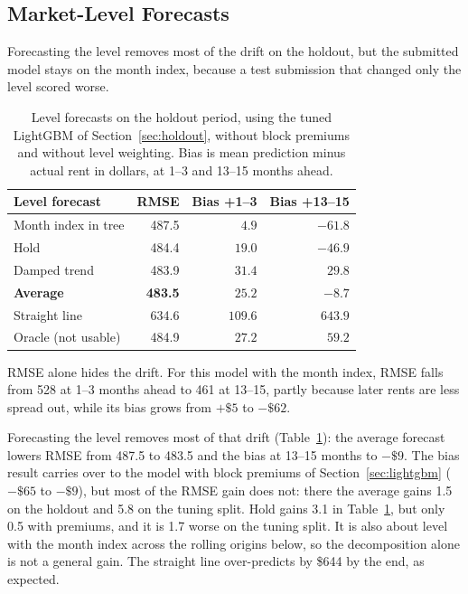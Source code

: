 
\subsection{Market-Level Forecasts}
\label{sec:level-results}

Forecasting the level removes most of the drift on the holdout, but the submitted model stays on the month index, because a test submission that changed only the level scored worse.

\begin{table}[htbp]
\caption{Level forecasts on the holdout period, using the tuned LightGBM of Section~\ref{sec:holdout}, without block premiums and without level weighting. Bias is mean prediction minus actual rent in dollars, at 1--3 and 13--15 months ahead.}
\begin{center}
\begin{tabular}{|l|r|r|r|}
\hline
\textbf{Level forecast} & \textbf{RMSE} & \textbf{Bias +1--3} &
\textbf{Bias +13--15} \\
\hline
Month index in tree     & 487.5 & $4.9$   & $-61.8$ \\
Hold                    & 484.4 & $19.0$  & $-46.9$ \\
Damped trend            & 483.9 & $31.4$  & $29.8$ \\
\textbf{Average}        & \textbf{483.5} & $25.2$ & $-8.7$ \\
Straight line           & 634.6 & $109.6$ & $643.9$ \\
\hline
Oracle (not usable)     & 484.9 & $27.2$  & $59.2$ \\
\hline
\end{tabular}
\label{tab:level-holdout}
\end{center}
\end{table}

RMSE alone hides the drift. For this model with the month index, RMSE falls
from 528 at 1--3 months ahead to 461 at 13--15, partly because later rents are
less spread out, while its bias grows from $+\$5$ to $-\$62$.

Forecasting the level removes most of that drift
(Table~\ref{tab:level-holdout}): the average forecast lowers RMSE from 487.5 to
483.5 and the bias at 13--15 months to $-\$9$. The bias result carries over to the
model with block premiums of Section~\ref{sec:lightgbm} ($-\$65$ to $-\$9$), but
most of the RMSE gain does not: there the average gains 1.5 on the holdout and 5.8
on the tuning split. Hold gains 3.1 in Table~\ref{tab:level-holdout}, but only 0.5
with premiums, and it is 1.7 worse on the tuning split. It is also about level
with the month index across the rolling origins below, so the decomposition alone
is not a general gain. The straight line over-predicts by \$644 by the end, as
expected.

